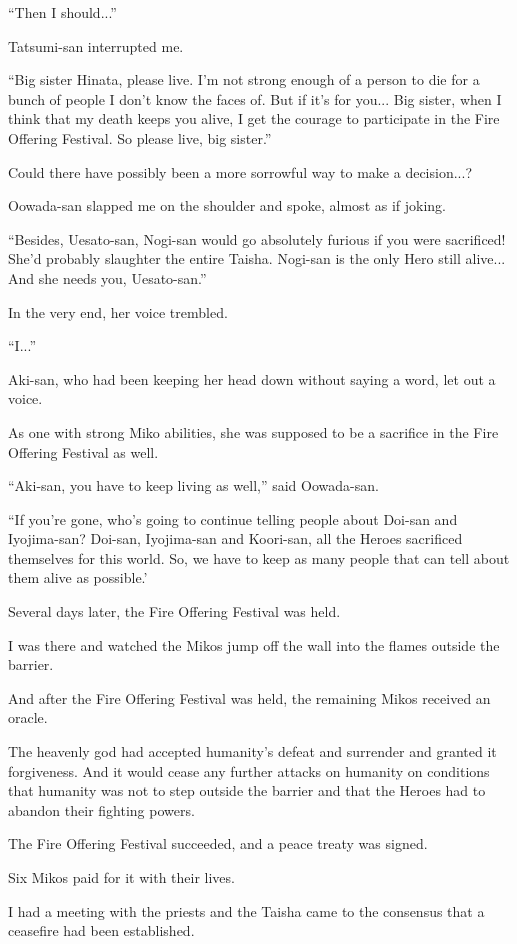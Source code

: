``Then I should...''

Tatsumi-san interrupted me.

``Big sister Hinata, please live. I'm not strong enough of a person to die for a bunch of people I don't know the faces of. But if it's for you... Big sister, when I think that my death keeps you alive, I get the courage to participate in the Fire Offering Festival. So please live, big sister.''

Could there have possibly been a more sorrowful way to make a decision...?

Oowada-san slapped me on the shoulder and spoke, almost as if joking.

``Besides, Uesato-san, Nogi-san would go absolutely furious if you were sacrificed! She'd probably slaughter the entire Taisha. Nogi-san is the only Hero still alive... And she needs you, Uesato-san.''

In the very end, her voice trembled.

``I...''

Aki-san, who had been keeping her head down without saying a word, let out a voice.

As one with strong Miko abilities, she was supposed to be a sacrifice in the Fire Offering Festival as well.

``Aki-san, you have to keep living as well,'' said Oowada-san.

``If you're gone, who's going to continue telling people about Doi-san and Iyojima-san? Doi-san, Iyojima-san and Koori-san, all the Heroes sacrificed themselves for this world. So, we have to keep as many people that can tell about them alive as possible.'

Several days later, the Fire Offering Festival was held.

I was there and watched the Mikos jump off the wall into the flames outside the barrier.

And after the Fire Offering Festival was held, the remaining Mikos received an oracle.

The heavenly god had accepted humanity's defeat and surrender and granted it forgiveness. And it would cease any further attacks on humanity on conditions that humanity was not to step outside the barrier and that the Heroes had to abandon their fighting powers.

The Fire Offering Festival succeeded, and a peace treaty was signed.

Six Mikos paid for it with their lives.

I had a meeting with the priests and the Taisha came to the consensus that a ceasefire had been established.

